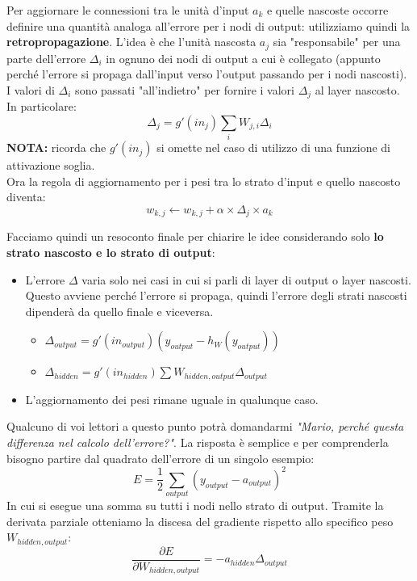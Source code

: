 					    Per aggiornare le connessioni tra le unità d'input $a_k$ e quelle nascoste occorre definire una quantità analoga all'errore per i nodi di output: utilizziamo quindi la \textbf{retropropagazione}. L'idea è che l'unità nascosta $a_j$ sia "responsabile" per una parte dell'errore $\Delta_i$ in ognuno dei nodi di output a cui è collegato (appunto perché l'errore si propaga dall'input verso l'output passando per i nodi nascosti). I valori di $\Delta_i$ sono passati "all'indietro" per fornire i valori $\Delta_j$ al layer nascosto. 
					    In particolare:
					    \[\Delta_j = g'(in_j)\sum_i{W_{j,i} \Delta_i} \]
					    \textbf{NOTA:} ricorda che $g'(in_j)$ si omette nel caso di utilizzo di una funzione di attivazione soglia.\\
					    Ora la regola di aggiornamento per i pesi tra lo strato d'input e quello nascosto diventa:
					   \[w_{k,j}\gets w_{k,j}+\alpha \times \Delta_j \times a_k\] 
					   
					   Facciamo quindi un resoconto finale per chiarire le idee considerando solo \textbf{lo strato nascosto e lo strato di output}:
					   \begin{itemize}
					       \item L'errore $\Delta$ varia solo nei casi in cui si parli di layer di output o layer nascosti. Questo avviene perché l'errore si propaga, quindi l'errore degli strati nascosti dipenderà da quello finale e viceversa.
					       \begin{itemize}
					           \item $\Delta_{output} = g'(in_{output}) (y_{output} - h_W(y_{output}))$
					           \item $\Delta_{hidden} =  g'(in_{hidden})\sum{W_{hidden,output} \Delta_{output}}$
					       \end{itemize}
					  
					       \item L'aggiornamento dei pesi rimane uguale in qualunque caso.
					   \end{itemize}
					   Qualcuno di voi lettori a questo punto potrà domandarmi \textit{"Mario, perché questa differenza nel calcolo dell'errore?"}. La risposta è semplice e per comprenderla bisogno partire dal quadrato dell'errore di un singolo esempio:
					   \[E = \frac{1}{2}\sum_{output}{(y_{output}-a_{output})^2}\]
					   In cui si esegue una somma su tutti i nodi nello strato di output. Tramite la derivata parziale otteniamo la discesa del gradiente rispetto allo specifico peso $W_{hidden,output}$:
					   \[\frac{\partial E}{\partial W_{hidden,output}} = - a_{hidden}\Delta_{output}\]
					
